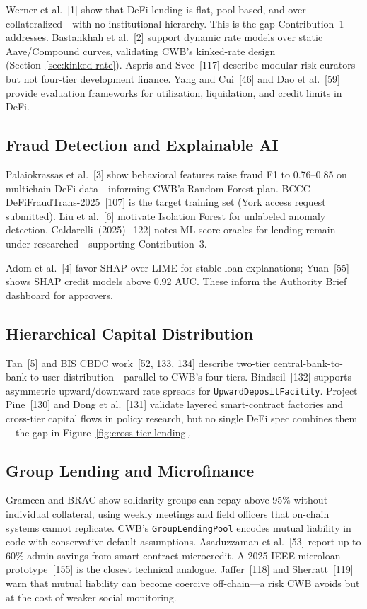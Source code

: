 \documentclass[12pt,a4paper]{report}
\begin{document}
Werner et al.~[1] show that DeFi lending is flat, pool-based, and over-collateralized---with no institutional hierarchy. This is the gap Contribution~1 addresses. Bastankhah et al.~[2] support dynamic rate models over static Aave/Compound curves, validating CWB's kinked-rate design (Section~\ref{sec:kinked-rate}). Aspris and Svec~[117] describe modular risk curators but not four-tier development finance. Yang and Cui~[46] and Dao et al.~[59] provide evaluation frameworks for utilization, liquidation, and credit limits in DeFi.

\subsection{Fraud Detection and Explainable AI}
\label{sec:lit-ml-oracle}

Palaiokrassas et al.~[3] show behavioral features raise fraud F1 to 0.76--0.85 on multichain DeFi data---informing CWB's Random Forest plan. BCCC-DeFiFraudTrans-2025~[107] is the target training set (York access request submitted). Liu et al.~[6] motivate Isolation Forest for unlabeled anomaly detection. Caldarelli~(2025)~[122] notes ML-score oracles for lending remain under-researched---supporting Contribution~3.

Adom et al.~[4] favor SHAP over LIME for stable loan explanations; Yuan~[55] shows SHAP credit models above 0.92 AUC. These inform the Authority Brief dashboard for approvers.

\subsection{Hierarchical Capital Distribution}
\label{sec:lit-cross-tier}

Tan~[5] and BIS CBDC work~[52, 133, 134] describe two-tier central-bank-to-bank-to-user distribution---parallel to CWB's four tiers. Bindseil~[132] supports asymmetric upward/downward rate spreads for \texttt{UpwardDepositFacility}. Project Pine~[130] and Dong et al.~[131] validate layered smart-contract factories and cross-tier capital flows in policy research, but no single DeFi spec combines them---the gap in Figure~\ref{fig:cross-tier-lending}.

\subsection{Group Lending and Microfinance}

Grameen and BRAC show solidarity groups can repay above 95\% without individual collateral, using weekly meetings and field officers that on-chain systems cannot replicate. CWB's \texttt{GroupLendingPool} encodes mutual liability in code with conservative default assumptions. Asaduzzaman et al.~[53] report up to 60\% admin savings from smart-contract microcredit. A 2025 IEEE microloan prototype~[155] is the closest technical analogue. Jaffer~[118] and Sherratt~[119] warn that mutual liability can become coercive off-chain---a risk CWB avoids but at the cost of weaker social monitoring.
\end{document}
